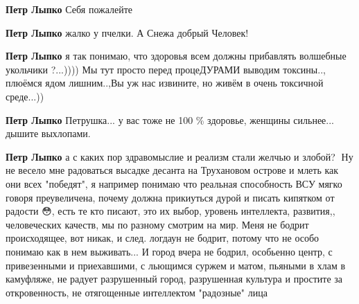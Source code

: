 \begin{itemize}
\begin{itemize}
\textbf{Петр Лыпко} Себя пожалейте

 
\textbf{Петр Лыпко} жалко у пчелки.
А Снежа добрый Человек!

 
\textbf{Петр Лыпко} я так понимаю, что здоровья всем должны прибавлять волшебные укольчики ?...)))) Мы тут просто перед процеДУРАМИ выводим токсины.., плюёмся ядом лишним..,Вы уж нас извините, но живём в очень токсичной среде...))

 
\textbf{Петр Лыпко} Петрушка... у вас тоже не 100 \% здоровье, женщины сильнее... дышите выхлопами.

 
\textbf{Петр Лыпко} а с каких пор здравомыслие и реализм стали желчью и злобой?
🤔Ну не весело мне радоваться высадке десанта на Трухановом острове и млеть как
они всех "победят", я например понимаю что реальная способность ВСУ мягко
говоря преувеличена, почему должна прикиуться дурой и писать кипятком от
радости 😳, есть те кто писают, это их выбор, уровень интеллекта, развития,,
человеческих качеств, мы по разному смотрим на мир. Меня не бодрит
происходящее, вот никак, и след. логдаун не бодрит, потому что не особо понимаю
как в нем выживать... И город вчера не бодрил, особьенно центр, с привезенными
и приехавшими, с льющимся суржем и матом, пьяными в хлам в камуфляже, не радует
разрушенный город, разрушенная культура и простите за откровенность, не
отягощенные интеллектом "радозные" лица


\end{itemize}
\end{itemize}
